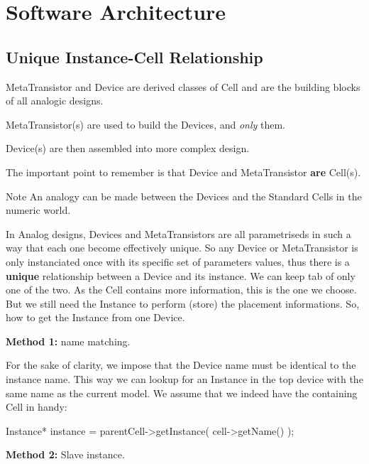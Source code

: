 \hypertarget{index_secMainDoc}{}\section{Software Architecture}\label{index_secMainDoc}
\hypertarget{index_ssecUniqueInstance}{}\subsection{Unique Instance-\/\+Cell Relationship}\label{index_ssecUniqueInstance}
Meta\+Transistor and Device are derived classes of Cell and are the building blocks of all analogic designs.
\begin{DoxyItemize}
\item Meta\+Transistor(s) are used to build the Devices, and {\itshape only} them.
\item Device(s) are then assembled into more complex design.
\end{DoxyItemize}

The important point to remember is that Device and Meta\+Transistor {\bfseries are} Cell(s).

\begin{DoxyNote}{Note}
An analogy can be made between the Devices and the Standard Cells in the numeric world.
\end{DoxyNote}
In Analog designs, Devices and Meta\+Transistors are all parametriseds in such a way that each one become effectively unique. So any Device or Meta\+Transistor is only instanciated once with it\textquotesingle{}s specific set of parameter\textquotesingle{}s values, thus there is a {\bfseries unique} relationship between a Device and it\textquotesingle{}s instance. We can keep tab of only one of the two. As the Cell contains more information, this is the one we choose. But we still need the Instance to perform (store) the placement informations. So, how to get the Instance from one Device.

{\bfseries Method 1\+:} name matching.

For the sake of clarity, we impose that the Device name must be identical to the instance name. This way we can lookup for an Instance in the top device with the same name as the current model. We assume that we indeed have the containing Cell in handy\+:


\begin{DoxyCode}
Instance* instance = parentCell->getInstance( cell->getName() );
\end{DoxyCode}


{\bfseries Method 2\+:} Slave instance.

